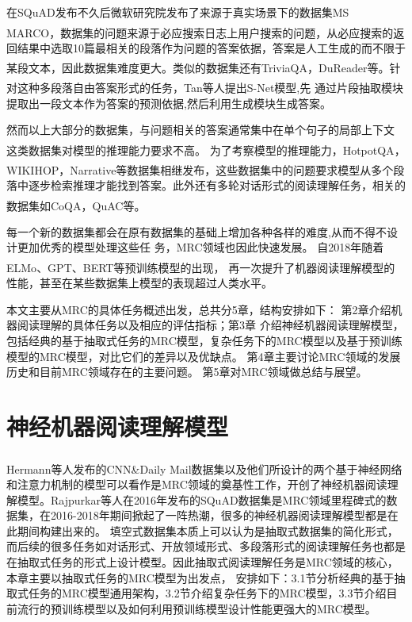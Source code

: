 \documentclass{article}
\newcommand{\upcite}[1]{\textsuperscript{\textsuperscript{\cite{#1}}}}
\begin{document}
在SQuAD发布不久后微软研究院发布了来源于真实场景下的数据集MS MARCO\upcite{MSmarco}，数据集的问题来源于必应搜索日志上用户搜索的问题，从必应搜索的返回结果中选取10篇最相关的段落作为问题的答案依据，答案是人工生成的而不限于某段文本，因此数据集难度更大。类似的数据集还有TriviaQA\upcite{TriviaQA}，DuReader\upcite{DuReader}等。针对这种多段落自由答案形式的任务，Tan等人\upcite{SNet}提出S-Net模型,先
通过片段抽取模块提取出一段文本作为答案的预测依据,然后利用生成模块生成答案。

然而以上大部分的数据集，与问题相关的答案通常集中在单个句子的局部上下文
这类数据集对模型的推理能力要求不高。
为了考察模型的推理能力，HotpotQA\upcite{HotpotQA}，WIKIHOP\upcite{WIKIHOP}，Narrative\upcite{NarrativeQA}等数据集相继发布，这些数据集中的问题要求模型从多个段落中逐步检索推理才能找到答案。此外还有多轮对话形式的阅读理解任务，相关的数据集如CoQA\upcite{CoQA}，QuAC\upcite{QuAC}等。

每一个新的数据集都会在原有数据集的基础上增加各种各样的难度,从而不得不设计更加优秀的模型处理这些任
务，MRC领域也因此快速发展。
自2018年随着ELMo\upcite{ELMo}、GPT\upcite{GPT}、BERT\upcite{BERT}等预训练模型的出现，
再一次提升了机器阅读理解模型的性能，甚至在某些数据集上模型的表现超过人类水平。

本文主要从MRC的具体任务概述出发，总共分5章，结构安排如下：
第2章介绍机器阅读理解的具体任务以及相应的评估指标；第3章
介绍神经机器阅读理解模型，包括经典的基于抽取式任务的MRC模型，复杂任务下的MRC模型以及基于预训练模型的MRC模型，对比它们的差异以及优缺点。
第4章主要讨论MRC领域的发展历史和目前MRC领域存在的主要问题。
第5章对MRC领域做总结与展望。



																																	



\section{神经机器阅读理解模型}
Hermann等人\upcite{Hermann}发布的CNN\&Daily Mail数据集以及他们所设计的两个基于神经网络和注意力机制的模型可以看作是MRC领域的奠基性工作，开创了神经机器阅读理解模型。Rajpurkar等人\cite{SQuAD1}在2016年发布的SQuAD数据集是MRC领域里程碑式的数据集，在2016-2018年期间掀起了一阵热潮，很多的神经机器阅读理解模型都是在此期间构建出来的。
填空式数据集本质上可以认为是抽取式数据集的简化形式，而后续的很多任务如对话形式、开放领域形式、多段落形式的阅读理解任务也都是在抽取式任务的形式上设计模型。因此抽取式阅读理解任务是MRC领域的核心，本章主要以抽取式任务的MRC模型为出发点，
安排如下：3.1节分析经典的基于抽取式任务的MRC模型通用架构，3.2节介绍复杂任务下的MRC模型，3.3节介绍目前流行的预训练模型以及如何利用预训练模型设计性能更强大的MRC模型。
\end{document}
